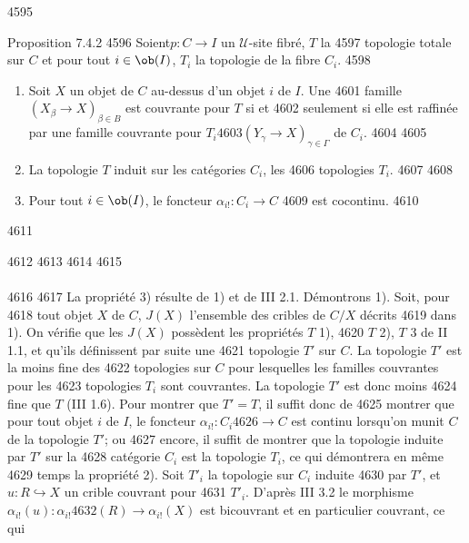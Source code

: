   4595	\begin{enonce*}{Proposition 7.4.2}
  4596	Soient\pageoriginale $p : C \to I$ un $𝒰$-site fibré, $T$ la
  4597	topologie totale sur $C$ et pour tout $i \in \ob(I)$, $T_i$ la topologie de la fibre $C_i$.
  4598	\begin{enumerate}
  4599	\renewcommand{\labelenumi}{\theenumi)}
  4600	\item Soit $X$ un objet de $C$ au-dessus d'un objet $i$ de $I$. Une
  4601	  famille $(X_\beta \to X)_{\beta \in B}$ est couvrante pour $T$ si et
  4602	  seulement si elle est raffinée par une famille couvrante pour $T_i
  4603	  (Y_{\gamma} \to X)_{\gamma \in \Gamma}$ de $C_i$.
  4604	
  4605	\item La topologie $T$ induit sur les catégories $C_i$, les
  4606	  topologies $T_i$.
  4607	
  4608	\item Pour tout $i \in \ob (I)$, le foncteur $\alpha_{i!} : C_i \to C$
  4609	  est cocontinu.
  4610	\end{enumerate}
  4611	\end{enonce*}
  4612	
  4613	\setcounter{subsubsection}{2}
  4614	\setcounter{paragraph}{0}
  4615	\paragraph{}
  4616	
  4617	La propriété 3) résulte de 1) et de III 2.1. Démontrons 1). Soit, pour
  4618	tout objet $X$ de $C$, $J(X)$ l'ensemble des cribles de $C/X$ décrits
  4619	dans 1). On vérifie que les $J(X)$ possèdent les propriétés $T$ 1),
  4620	$T$ 2), $T$ 3 de II 1.1, et qu'ils définissent par suite une
  4621	topologie $T'$ sur $C$. La topologie $T'$ est la moins fine des
  4622	topologies sur $C$ pour lesquelles les familles couvrantes pour les
  4623	topologies $T_i$ sont couvrantes. La topologie $T'$ est donc moins
  4624	fine que $T$ (III 1.6). Pour montrer que $T'= T$, il suffit donc de
  4625	montrer que pour tout objet $i$ de $I$, le foncteur $\alpha_{i!} : C_i
  4626	\to C$ est continu lorsqu'on munit $C$ de la topologie $T'$; ou
  4627	encore, il suffit de montrer que la topologie induite par $T'$ sur la
  4628	catégorie $C_i$ est la topologie $T_i$, ce qui démontrera en même
  4629	temps la propriété 2). Soit $T'_i$ la topologie sur $C_i$ induite
  4630	par $T'$, et $u : R \hookrightarrow X$ un crible couvrant pour
  4631	$T'_i$. D'après III 3.2 le morphisme $\alpha_{i!} (u) : \alpha_{i!}
  4632	(R)\to \alpha_{i!} (X)$ est bicouvrant et en particulier couvrant, ce qui
